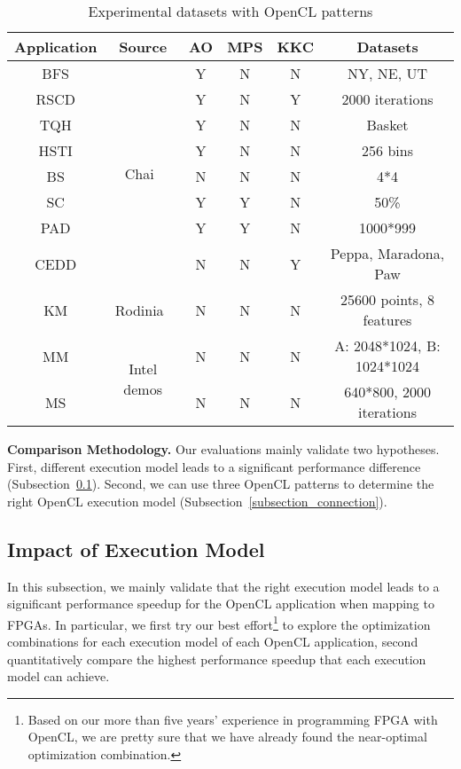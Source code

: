 \begin{table}%
    \centering
        \begin{scriptsize}
    \begin{tabular}{|c|c|c|c|c|c|}
        \hline
        Application & Source & AO & MPS & KKC & Datasets \\
        \hline
        BFS & \multirow{8}{*}{Chai~\cite{chang2017collaborative}} & Y & N & N & NY, NE, UT \\
        \cline{1-1} \cline{3-6}
        RSCD &  & Y & N & Y & 2000 iterations \\
        \cline{1-1} \cline{3-6}
        TQH &  & Y & N & N & Basket \\
        \cline{1-1} \cline{3-6}
        HSTI &  & Y & N & N & 256 bins \\
        \cline{1-1} \cline{3-6}
        BS &  & N & N & N & 4*4 \\
        \cline{1-1} \cline{3-6}
        SC &  & Y & Y & N & 50\% \\
        \cline{1-1} \cline{3-6}
        PAD &  & Y & Y & N & 1000*999 \\
        \cline{1-1} \cline{3-6}
        CEDD &  & N & N & Y & Peppa, Maradona, Paw \\
        \hline
        KM & Rodinia~\cite{rodinia_iiswc09} & N & N & N & 25600 points, 8 features \\
        \hline
        MM & \multirow{2}{*}{Intel demos} & N & N & N & A: 2048*1024, B: 1024*1024 \\
        \cline{1-1} \cline{3-6}
        MS &  & N & N & N & 640*800, 2000 iterations \\
        \hline
    \end{tabular}
        \end{scriptsize}
    \caption{Experimental datasets with OpenCL patterns}
    \vspace{-5.5ex}
    \label{t_dataset}
\end{table}


{\bf Comparison Methodology. }
Our evaluations mainly validate two hypotheses. First, different execution model leads to a significant performance difference (Subsection~\ref{subsec_evaluation}). Second, we can use three OpenCL patterns to determine the right OpenCL execution model (Subsection~\ref{subsection_connection}).  

\vspace{-1ex}
\subsection{Impact of Execution Model}
\label{subsec_evaluation}
In this subsection, we mainly validate that the right execution model leads to a significant performance speedup for the OpenCL application when mapping to FPGAs. In particular, we first try our best effort\footnote{Based on our more than five years' experience in programming FPGA with OpenCL, we are pretty sure that we have already found the near-optimal optimization combination. } to explore the optimization combinations for each execution model of each OpenCL application, second quantitatively compare the highest performance speedup that each execution model can achieve. 



